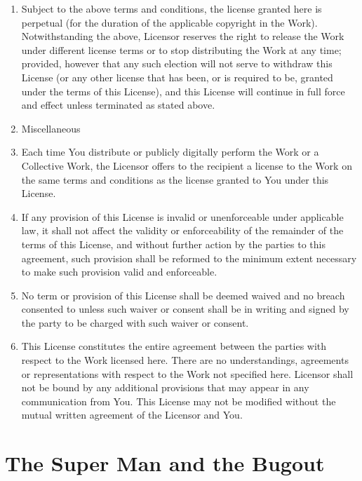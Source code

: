 \begin{enumerate}
\item
  Subject to the above terms and conditions, the license granted here
  is perpetual (for the duration of the applicable copyright in the
  Work). Notwithstanding the above, Licensor reserves the right to
  release the Work under different license terms or to stop
  distributing the Work at any time; provided, however that any such
  election will not serve to withdraw this License (or any other
  license that has been, or is required to be, granted under the
  terms of this License), and this License will continue in full
  force and effect unless terminated as stated above.

\item
  Miscellaneous

\item
  Each time You distribute or publicly digitally perform the Work or
  a Collective Work, the Licensor offers to the recipient a license
  to the Work on the same terms and conditions as the license granted
  to You under this License.

\item
  If any provision of this License is invalid or unenforceable under
  applicable law, it shall not affect the validity or enforceability
  of the remainder of the terms of this License, and without further
  action by the parties to this agreement, such provision shall be
  reformed to the minimum extent necessary to make such provision
  valid and enforceable.

\item
  No term or provision of this License shall be deemed waived and no
  breach consented to unless such waiver or consent shall be in
  writing and signed by the party to be charged with such waiver or
  consent.

\item
  This License constitutes the entire agreement between the parties
  with respect to the Work licensed here. There are no
  understandings, agreements or representations with respect to the
  Work not specified here. Licensor shall not be bound by any
  additional provisions that may appear in any communication from
  You. This License may not be modified without the mutual written
  agreement of the Licensor and You.

\end{enumerate}

\section{The Super Man and the Bugout}

